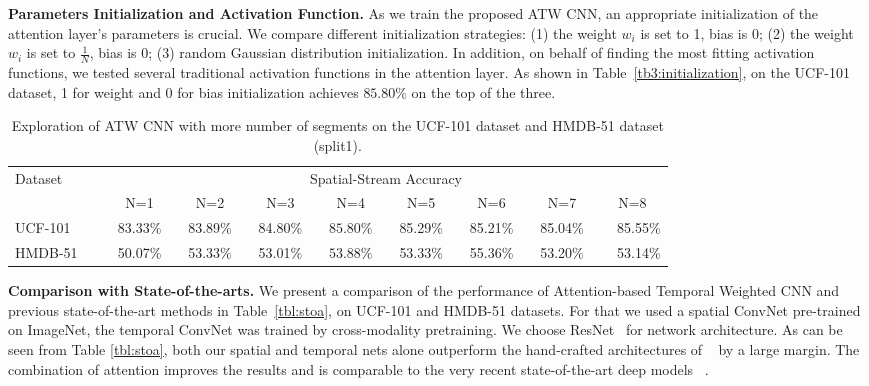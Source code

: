 \documentclass[runningheads,a4paper]{llncs}
\begin{document}
\noindent \textbf{Parameters Initialization and Activation Function.}
As we train the proposed ATW CNN, an appropriate initialization of the attention
layer's parameters is crucial. We compare different initialization strategies: (1) the weight $w_i$ is set to 1,
bias is 0; (2) the weight $w_i$ is set to $\frac{1}{N}$, bias is 0; (3) random Gaussian distribution initialization.
In addition, on behalf of finding the most fitting activation functions,
we tested several traditional activation functions in the attention layer.
As shown in Table~\ref{tb3:initialization}, on the UCF-101 dataset, 1 for weight and 0 for bias initialization
achieves $85.80\%$ on the top of the three.
%
\begin{table*}[t]
	\caption{Exploration of ATW CNN with more number
		of segments on the UCF-101 dataset and HMDB-51 dataset (split1).}
	\label{tb2:attention}
	\begin{center}
		\begin{small}
			\begin{tabular}{lcccccccr}
				\toprule
				\multirow{2}{*}{Dataset~~~~~} & \multicolumn{8}{c}{Spatial-Stream Accuracy} \\
				\cline{2-9}
				& ~~N=1~~ & ~~N=2~~ & ~~N=3~~ & ~~N=4~~ & ~~N=5~~ & ~~N=6~~ & ~~N=7~~ & ~~N=8~~  \\
				\midrule
				UCF-101 & 83.33\% & 83.89\% & 84.80\% & $\mathbf{85.80\%}$ &  85.29\% & 85.21\% & 85.04\% & 85.55\% \\
				HMDB-51 & 50.07\% & 53.33\% & 53.01\% & $\mathbf{53.88\%}$  & 53.33\% & 55.36\% & 53.20\% & 53.14\% \\
				\bottomrule
			\end{tabular}
		\end{small}
	\end{center}
\end{table*}
%



\noindent \textbf{Comparison with State-of-the-arts.} We present a comparison of the performance of Attention-based Temporal Weighted CNN and previous
state-of-the-art methods in Table~\ref{tbl:stoa}, on UCF-101 and HMDB-51 datasets. For that we used a
spatial ConvNet pre-trained on ImageNet, the temporal ConvNet was trained by cross-modality
pretraining. We choose ResNet~\cite{he2016deep} for network architecture.
As can be seen from Table \ref{tbl:stoa}, both our spatial and temporal nets
alone outperform the hand-crafted architectures of
~\cite{cai2014multi,wang2013action,peng2016bag,wang2016mofap}
by a large margin. The combination of
attention improves the results and is comparable
to the very recent state-of-the-art deep models
~\cite{simonyan2014two,wang2016temporal,sun2015human,tran2015learning,
wang2015action,varol2017long,zhu2016key,fernando2015modeling,ni2015motion}.
\end{document}
